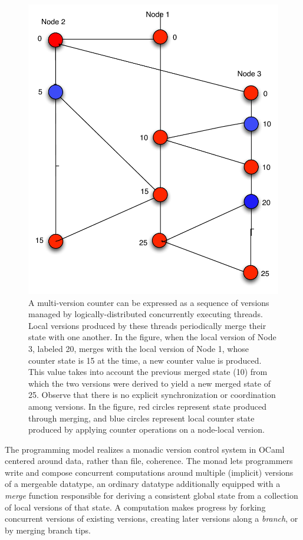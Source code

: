 \begin{figure}
  \begin{center}
    \includegraphics[scale=0.35]{Figures/dali-counter}
  \end{center}
  \caption{\small A multi-version counter can be expressed as a
    sequence of versions managed by logically-distributed concurrently
    executing threads.  Local versions produced by these threads
    periodically merge their state with one another.  In the figure,
    when the local version of Node 3, labeled 20, merges with the
    local version of Node 1, whose counter state is 15 at the time, a
    new counter value is produced.  This value takes into account the
    previous merged state (10) from which the two versions were
    derived to yield a new merged state of 25.  Observe that there is
    no explicit synchronization or coordination among versions.  In
    the figure, red circles represent state produced through merging,
    and blue circles represent local counter state produced by
    applying counter operations on a node-local version.  }
\end{figure}
The \name programming model realizes a monadic version control system
in OCaml centered around data, rather than file, coherence.  The \name
monad lets programmers write and compose concurrent computations
around multiple (implicit) versions of a mergeable datatype, an
ordinary datatype additionally equipped with a \emph{merge} function
responsible for deriving a consistent global state from a collection
of local versions of that state.  A computation makes progress by
forking concurrent versions of existing versions, creating later
versions along a \emph{branch}, or by merging branch tips.

